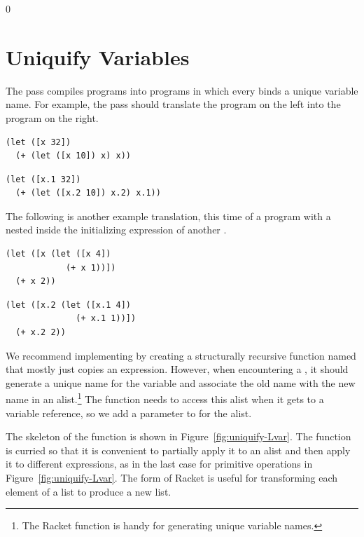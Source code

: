 \documentclass[7x10,nocrop]{TimesAPriori_MIT}%
\def\racketEd{0}
\def\edition{1}
\begin{document}
{\if\edition\racketEd  
\section{Uniquify Variables}
\label{sec:uniquify-Lvar}

The  pass compiles \LangVar{} programs into \LangVar{}
programs in which every  binds a unique variable name. For
example, the  pass should translate the program on the
left into the program on the right. 
\begin{transformation}
\begin{lstlisting}
(let ([x 32])
  (+ (let ([x 10]) x) x))
\end{lstlisting}
\compilesto
\begin{lstlisting}
(let ([x.1 32])
  (+ (let ([x.2 10]) x.2) x.1))
\end{lstlisting}
\end{transformation}
The following is another example translation, this time of a program
with a  nested inside the initializing expression of another
.
\begin{transformation}
\begin{lstlisting}
(let ([x (let ([x 4])
            (+ x 1))])
  (+ x 2))
\end{lstlisting}
\compilesto
\begin{lstlisting}
(let ([x.2 (let ([x.1 4])
              (+ x.1 1))])
  (+ x.2 2))
\end{lstlisting}
\end{transformation}

We recommend implementing  by creating a structurally
recursive function named  that mostly just copies
an expression. However, when encountering a , it should
generate a unique name for the variable and associate the old name
with the new name in an alist.\footnote{The Racket function
   is handy for generating unique variable names.} The
 function needs to access this alist when it gets
to a variable reference, so we add a parameter to 
for the alist.

The skeleton of the  function is shown in
Figure~\ref{fig:uniquify-Lvar}.  The function is curried so that it is
convenient to partially apply it to an alist and then apply it to
different expressions, as in the last case for primitive operations in
Figure~\ref{fig:uniquify-Lvar}.  The
%
\href{https://docs.racket-lang.org/reference/for.html#%28form._%28%28lib._racket%2Fprivate%2Fbase..rkt%29._for%2Flist%29%29}{\key{for/list}}
%
form of Racket is useful for transforming each element of a list to
produce a new list.

}
\end{document}
